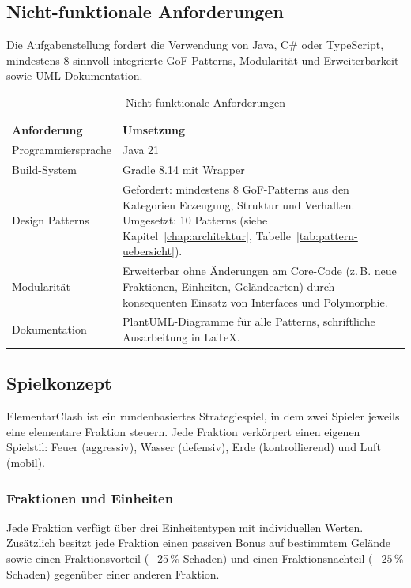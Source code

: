 \subsection{Nicht-funktionale Anforderungen}
\label{sec:nicht-funktionale-anforderungen}

Die Aufgabenstellung fordert die Verwendung von Java, C\# oder TypeScript, mindestens 8 sinnvoll integrierte GoF-Patterns,
Modularität und Erweiterbarkeit sowie UML-Dokumentation.

\begin{table}[H]
\centering
\begin{tabular}{l p{10cm}}
\toprule
\textbf{Anforderung} & \textbf{Umsetzung} \\
\midrule
Programmiersprache & Java 21~\cite{java21} \\
Build-System & Gradle 8.14 mit Wrapper~\cite{gradle} \\
Design Patterns & Gefordert: mindestens 8 GoF-Patterns aus den Kategorien Erzeugung, Struktur und Verhalten. Umgesetzt: 10 Patterns (siehe Kapitel~\ref{chap:architektur}, Tabelle~\ref{tab:pattern-uebersicht}). \\
Modularität & Erweiterbar ohne Änderungen am Core-Code (z.\,B. neue Fraktionen, Einheiten, Geländearten) durch konsequenten Einsatz von Interfaces und Polymorphie. \\
Dokumentation & PlantUML-Diagramme für alle Patterns, schriftliche Ausarbeitung in \LaTeX. \\
\bottomrule
\end{tabular}
\caption{Nicht-funktionale Anforderungen}
\label{tab:nicht-funktionale-anforderungen}
\end{table}

\subsection{Spielkonzept}
\label{sec:spielkonzept}

ElementarClash ist ein rundenbasiertes Strategiespiel, in dem zwei Spieler jeweils eine elementare Fraktion steuern.
Jede Fraktion verkörpert einen eigenen Spielstil: Feuer (aggressiv), Wasser (defensiv), Erde (kontrollierend) und Luft (mobil).

\subsubsection{Fraktionen und Einheiten}
\label{subsec:fraktionen-einheiten}

Jede Fraktion verfügt über drei Einheitentypen mit individuellen Werten.
Zusätzlich besitzt jede Fraktion einen passiven Bonus auf bestimmtem Gelände sowie einen Fraktionsvorteil (+25\,\% Schaden)
und einen Fraktionsnachteil ($-25$\,\% Schaden) gegenüber einer anderen Fraktion.

